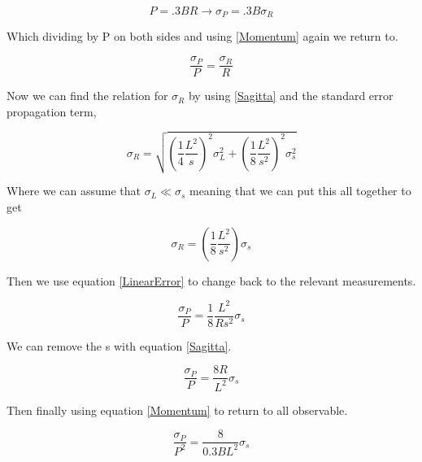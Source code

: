 	\begin{equation}
		P = .3 B R \rightarrow  \sigma_P = .3 B \sigma_R
	\end{equation}
	
	Which dividing by P on both sides and using \ref{Momentum} again we return to.


	\begin{equation}
		 \frac{\sigma_P}{P} = \frac{\sigma_R}{R} \label{LinearError}
	\end{equation}
	
	Now we can find the relation for $\sigma_R$ by using \ref{Sagitta} and the standard error propagation term,
	
	\begin{equation}
		 \sigma_R = \sqrt{\left(\frac{1}{4} \frac{L^2}{s}\right)^2 \sigma_L^2 + \left( \frac{1}{8} \frac{L^2}{s^2} \right)^2 \sigma^2_s}
	\end{equation}
	
	Where we can assume that $\sigma_L \ll \sigma_s$ meaning that we can put this all together to get 
	
		\begin{equation}
			\sigma_R = \left( \frac{1}{8} \frac{L^2}{s^2} \right) \sigma_s
		\end{equation}
		
		Then we use equation \ref{LinearError} to change back to the relevant measurements. 
		
		\begin{equation}
			\frac{\sigma_P}{P} = \frac{1}{8} \frac{L^2}{R s^2} \sigma_s
		\end{equation}
		
		We can remove the s with equation \ref{Sagitta}.
		
		\begin{equation}
			\frac{\sigma_P}{P} = \frac{8 R}{ L^2} \sigma_s
		\end{equation}
	
		Then finally using equation \ref{Momentum} to return to all observable. 
			
	\begin{equation}
		\frac{\sigma_P}{P^2} = \frac{8}{0.3 B L^2} \sigma_s
		\label{eq:pT_error}
	\end{equation}

